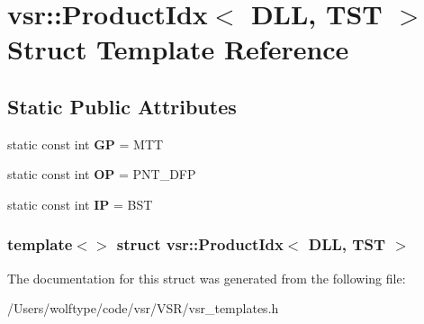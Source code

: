 \hypertarget{structvsr_1_1_product_idx_3_01_d_l_l_00_01_t_s_t_01_4}{\section{vsr\-:\-:Product\-Idx$<$ D\-L\-L, T\-S\-T $>$ Struct Template Reference}
\label{structvsr_1_1_product_idx_3_01_d_l_l_00_01_t_s_t_01_4}
}
\subsection*{Static Public Attributes}
\begin{DoxyCompactItemize}
\item 
\hypertarget{structvsr_1_1_product_idx_3_01_d_l_l_00_01_t_s_t_01_4_adb7627292694262296176b05a3e53c6c}{static const int {\bfseries G\-P} = M\-T\-T}\label{structvsr_1_1_product_idx_3_01_d_l_l_00_01_t_s_t_01_4_adb7627292694262296176b05a3e53c6c}

\item 
\hypertarget{structvsr_1_1_product_idx_3_01_d_l_l_00_01_t_s_t_01_4_a8787ef1563775b15d5e0ac72385bfa7b}{static const int {\bfseries O\-P} = P\-N\-T\-\_\-\-D\-F\-P}\label{structvsr_1_1_product_idx_3_01_d_l_l_00_01_t_s_t_01_4_a8787ef1563775b15d5e0ac72385bfa7b}

\item 
\hypertarget{structvsr_1_1_product_idx_3_01_d_l_l_00_01_t_s_t_01_4_a95aa684abf20909fc0ca0edd769c518c}{static const int {\bfseries I\-P} = B\-S\-T}\label{structvsr_1_1_product_idx_3_01_d_l_l_00_01_t_s_t_01_4_a95aa684abf20909fc0ca0edd769c518c}

\end{DoxyCompactItemize}
\subsubsection*{template$<$$>$ struct vsr\-::\-Product\-Idx$<$ D\-L\-L, T\-S\-T $>$}



The documentation for this struct was generated from the following file\-:\begin{DoxyCompactItemize}
\item 
/\-Users/wolftype/code/vsr/\-V\-S\-R/vsr\-\_\-templates.\-h\end{DoxyCompactItemize}
